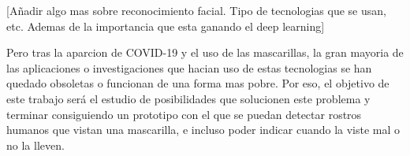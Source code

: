 [Añadir algo mas sobre reconocimiento facial. Tipo de tecnologias que se usan, etc. Ademas de la importancia que esta ganando el deep learning]

Pero tras la aparcion de COVID-19 y el uso de las mascarillas, la gran mayoria de las aplicaciones o investigaciones que hacian uso de estas tecnologias se han quedado obsoletas o funcionan de una forma mas pobre. Por eso, el objetivo de este trabajo será el estudio de posibilidades que solucionen este problema y terminar consiguiendo un prototipo con el que se puedan detectar rostros humanos que vistan una mascarilla, e incluso poder indicar cuando la viste mal o no la lleven. 


